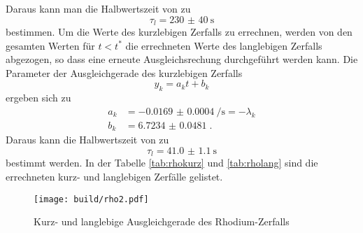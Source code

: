 Daraus kann man die Halbwertszeit von  zu 
\begin{equation*}
    \tau_l = \SI{230(40)}{\second}
\end{equation*}
bestimmen.
Um die Werte des kurzlebigen Zerfalls zu errechnen, werden von den gesamten Werten für $t < t^*$ die errechneten Werte des langlebigen Zerfalls abgezogen,
so dass eine erneute Ausgleichsrechung durchgeführt werden kann.
Die Parameter der Ausgleichgerade des kurzlebigen Zerfalls
\begin{equation}
    y_k = a_k t + b_k
\end{equation}
ergeben sich zu
\begin{align*}
    a_k &= \SI{-0.0169(4)}{\per\second} = - \lambda_k \\
    b_k &= \num{6.7234(481)} \; \text{.}
\end{align*}
Daraus kann die Halbwertszeit von  zu 
\begin{equation*}
    \tau_l = \SI{41.0(11)}{\second}
\end{equation*}
bestimmt werden.
In der Tabelle \ref{tab:rhokurz} und \ref{tab:rholang} sind die errechneten kurz- und langlebigen Zerfälle gelistet.
\begin{figure}
    \centering
    \caption{Kurz- und langlebige Ausgleichgerade des Rhodium-Zerfalls}
    \label{fig:rhoaang}
    \texttt{[image: build/rho2.pdf]}
\end{figure}
